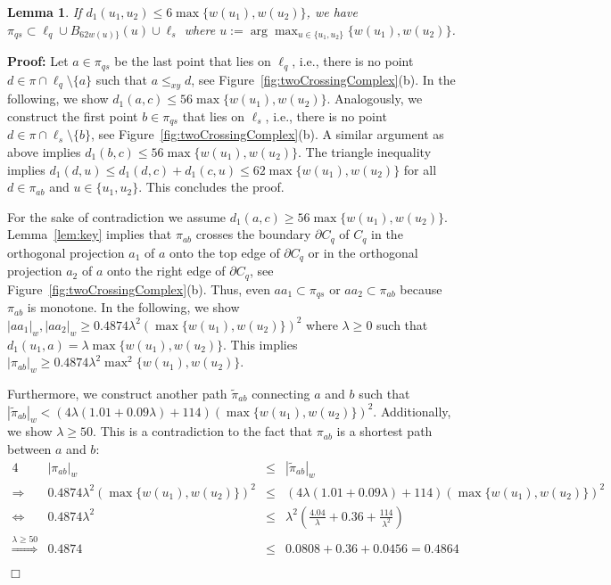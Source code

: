 \documentclass[a4paper,11pt]{article}
\newtheorem{lemma}{Lemma}
\newenvironment{proof}{\textbf{Proof:}}{\hspace*{0mm}\hfill\ensuremath{\Box}}
\begin{document}
\begin{lemma}\label{lem:twoCrossingComplex}
	If $d_1(u_1,u_2) \leq 6 \max \{ w(u_1), w(u_2) \}$,  we have $\pi_{qs} \subset \ell_{q} \cup B_{62 w(u) \}}(u) \cup \ell_s$ where $u := \arg \max_{u \in \{ u_1,u_2 \} } \{ w(u_1), w(u_2) \}$.
\end{lemma}
\begin{proof} Let $a \in \pi_{qs}$ be the last point that lies on $\ell_q$, i.e., there is no point $d \in \pi \cap \ell_q \setminus \{ a \}$ such that $a \leq_{xy} d$, see Figure~\ref{fig:twoCrossingComplex}(b). In the following, we show $d_1(a,c) \leq 56 \max \{ w(u_1), w(u_2) \}$. Analogously, we construct the first point $b \in \pi_{qs}$ that lies on $\ell_s$, i.e., there is no point $d \in \pi \cap \ell_s \setminus \{ b \}$, see Figure~\ref{fig:twoCrossingComplex}(b). A similar argument as above implies $d_1 (b,c) \leq 56 \max \{ w(u_1),w(u_2) \}$. The triangle inequality implies $d_1(d,u) \leq d_1(d,c)+d_1(c,u) \leq 62 \max \{ w(u_1),w(u_2) \}$ for all $d \in \pi_{ab}$ and $u \in \{ u_1,u_2 \}$. This concludes the proof.

	For the sake of contradiction we assume $d_1(a,c) \geq 56 \max \{ w(u_1), w(u_2) \}$. Lemma~\ref{lem:key} implies that $\pi_{ab}$ crosses the boundary $\partial C_q$ of $C_q$ in the orthogonal projection $a_1$ of $a$ onto the top edge of $\partial C_q$ or in the orthogonal projection $a_2$ of $a$ onto the right edge of $\partial C_q$, see Figure~\ref{fig:twoCrossingComplex}(b). Thus, even $aa_1 \subset \pi_{qs}$ or $aa_2 \subset \pi_{ab}$ because $\pi_{ab}$ is monotone. In the following, we show $|aa_1|_w, |aa_2|_w \geq 0.4874 \lambda^2 (\max \{ w(u_1),w(u_2)\})^2$ where $\lambda \geq 0$ such that $ d_1(u_1,a) = \lambda \max \{ w(u_1), w(u_2) \}$. This implies $|\pi_{ab}|_w \geq 0.4874 \lambda^2 \max^2 \{ w(u_1), w(u_2) \}$. 
		
	Furthermore, we construct another path $\widetilde{\pi}_{ab}$ connecting $a$ and $b$ such that $|\widetilde{\pi}_{ab}|_w < ( 4 \lambda (1.01 + 0.09 \lambda) + 114) (\max \{ w(u_1), w(u_2)\})^2$. Additionally, we show $\lambda \geq 50$. This is a contradiction to the fact that $\pi_{ab}$ is a shortest path between $a$ and $b$:
		\begin{alignat*}{4}
			&|\pi_{ab}|_w&\leq&|\widetilde{\pi}_{ab}|_w\\
			\Rightarrow & 0.4874 \lambda^2 (\max \{ w(u_1), w(u_2) \})^2 & \leq & ( 4 \lambda (1.01 + 0.09 \lambda) + 114) (\max \{ w(u_1), w(u_2)\})^2\\
			\Leftrightarrow & 0.4874 \lambda^2 & \leq & \lambda^2 (\frac{4.04}{\lambda} + 0.36 + \frac{114}{\lambda^2})\\
			\stackrel{\lambda \geq 50}{\Rightarrow} & 0.4874 & \leq & 0.0808 + 0.36 + 0.0456 = 0.4864
		\end{alignat*}
	

\end{proof}
\end{document}
